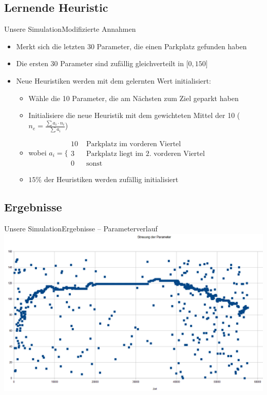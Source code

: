 \documentclass[11pt]{beamer}
\begin{document}
\subsection{Lernende Heuristic}

\begin{frame}{Unsere Simulation}{Modifizierte Annahmen}

	\begin{itemize}
		\item Merkt sich die letzten 30 Parameter, die einen Parkplatz gefunden haben
		\item Die ersten 30 Parameter sind zufällig gleichverteilt in $\lbrack 0,150\rbrack$
		\item Neue Heuristiken werden mit dem gelernten Wert initialisiert:
		\begin{itemize}
			\item Wähle die 10 Parameter, die am Nächsten zum Ziel geparkt haben
			\item Initialisiere die neue Heuristik mit dem gewichteten Mittel der 10 ($n_e=\frac{\sum a_i\cdot n_i}{\sum a_i}$)
			\item wobei $a_i = \Biggl\lbrace 
				\begin{matrix}
					10 & \text{ Parkplatz im vorderen Viertel}\\
					3 & \text { Parkplatz liegt im 2. vorderen Viertel}\\
					0 & \text{ sonst}
				\end{matrix}$
			\item $15\%$ der Heuristiken werden zufällig initialisiert
		\end{itemize}
	\end{itemize}

\end{frame}


\subsection{Ergebnisse}

\begin{frame}{Unsere Simulation}{Ergebnisse --  Parameterverlauf}
	\includegraphics[width=\textwidth]{streuung.png}
\end{frame}
\end{document}
